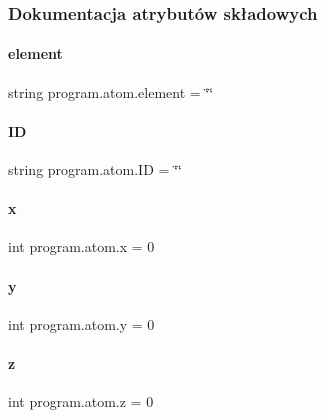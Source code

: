 \subsubsection{Dokumentacja atrybutów składowych}
\mbox{\label{classprogram_1_1atom_a5fa9a282889868d0c16746363dc0b752}} 
\paragraph{element}
{\footnotesize\ttfamily string program.\+atom.\+element = \char`\"{}\char`\"{}\hspace{0.3cm}{\ttfamily [static]}}

\mbox{\label{classprogram_1_1atom_ad5d5e12a3a0d6fbea03c4ac869a7515b}} 
\paragraph{ID}
{\footnotesize\ttfamily string program.\+atom.\+ID = \char`\"{}\char`\"{}\hspace{0.3cm}{\ttfamily [static]}}

\mbox{\label{classprogram_1_1atom_a47cec40d5c2d49c7e02077c0ebcbb585}} 
\paragraph{x}
{\footnotesize\ttfamily int program.\+atom.\+x = 0\hspace{0.3cm}{\ttfamily [static]}}

\mbox{\label{classprogram_1_1atom_aecd799b1f1cbb084dbc98af69aa2163a}} 
\paragraph{y}
{\footnotesize\ttfamily int program.\+atom.\+y = 0\hspace{0.3cm}{\ttfamily [static]}}

\mbox{\label{classprogram_1_1atom_a3d70a7f1f2c0245028269b09a9c03cb7}} 
\paragraph{z}
{\footnotesize\ttfamily int program.\+atom.\+z = 0\hspace{0.3cm}{\ttfamily [static]}}

